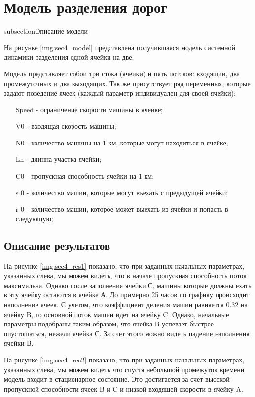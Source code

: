 \section{Модель разделения дорог}

subsection{Описание модели}

На рисунке \ref{img:sec4_model} представлена получившаяся модель системной динамики разделения одной ячейки на две.

Модель представляет собой три стока (ячейки) и пять потоков: входящий, два промежуточных и два выходящих.
Так же присутствует ряд переменных, которые задают поведение ячеек (каждый параметр индивидуален для своей ячейки):
\begin{itemize}
    \item[Speed] - ограничение скорости машины в ячейке;
    \item[V0] - входящая скорость машины;
    \item[N0] - количество машины на 1 км, которые могут находиться в ячейке;
    \item[Ln] - длинна участка ячейки;
    \item[C0] - пропускная способность ячейки на 1 км;
    \item[s 0] - количество машин, которые могут въехать с предыдущей ячейки;
    \item[r 0] - количество машин, которое может выехать из ячейки и попасть в следующую;
\end{itemize}


\subsection{Описание результатов}

На рисунке \ref{img:sec4_res1} показано, что при заданных начальных параметрах, указанных слева, мы можем видеть, что в начале пропускная способность поток максимальна. Однако после заполнения ячейки С, машины которые должны ехать в эту ячейку остаются в ячейке А. До примерно 25 часов по графику происходит наполнение ячеек. С учетом, что коэффициент деления машин равняется $0.32$ на ячейку B, то основной поток машин идет на ячейку C. Однако, начальные параметры подобраны таким образом, что ячейка В успевает быстрее опустошаться, нежели ячейка С. За счет этого можно видеть падение наполнения ячейки В.


На рисунке \ref{img:sec4_res2} показано, что при заданных начальных параметрах, указанных слева, мы можем видеть что спустя небольшой промежуток времени модель входит в стационарное состояние. Это достигается за счет высокой пропускной способности ячеек B и C и низкой входящей скорости в ячейку A.


\clearpage